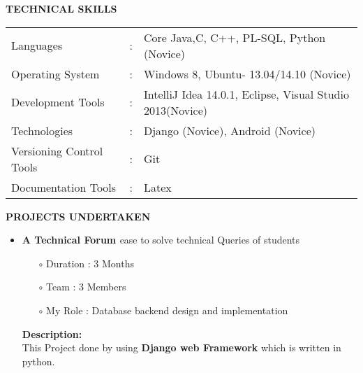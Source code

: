 \documentclass{article}
\begin{document}
\vspace{1cm}
\begin{minipage}{\textwidth}
\begin{framed}
	\large{\textbf{TECHNICAL SKILLS}}
\end{framed}
\setlength{\tabcolsep}{0.7em}
\def\arraystretch{1.7}
\begin{tabular}{lcp{}}
	Languages & : & Core Java,C, C++, PL-SQL, Python (Novice)\\
	Operating System &  : &  Windows 8, Ubuntu- 13.04/14.10 (Novice)\\
	Development Tools &  : & IntelliJ Idea 14.0.1, Eclipse, Visual Studio 2013(Novice)\\
	Technologies &  : &  Django (Novice), Android (Novice)\\
	Versioning Control Tools & : & Git\\
	Documentation Tools & : & Latex\\

\end{tabular}
\end{minipage}

\vspace{1cm}


\begin{minipage}{\textwidth}

\begin{framed}
	\large{\textbf{PROJECTS UNDERTAKEN}}
\end{framed}
\begin{itemize}
	\itemsep1pt \parskip0pt 
	\setlength{\itemsep}{0.1cm}%
	\setlength{\parskip}{0.2cm}%

	\item{
		\textbf{\large{A Technical Forum }}ease to solve technical Queries of students
		\begin{itemize}
			\item[$\circ$] {Duration : 3 Months}
			\item[$\circ$] {Team : 3 Members}
			\item[$\circ$] {My Role : Database backend design and implementation}
		\end{itemize}
	\textbf{Description:}\\
		\setlength{\parindent}{15pt}
		\indent This Project done by using \textbf{Django web Framework} which is written in python.
	}
\end{itemize}
\end{minipage}	
\end{document}
